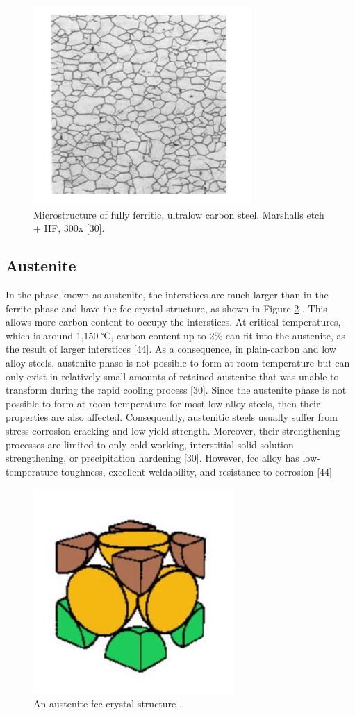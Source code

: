 \documentclass[12pt]{report}
\begin{document}
\begin{figure}[H]
    \centering
    \includegraphics[width=.5\textwidth]{microstructure_of_carbon_steel.jpg}
    \caption{Microstructure of fully ferritic, ultralow carbon steel. Marshalls etch + HF, 300x [30].}
    \label{ch3:figure:microstructure}
\end{figure}

\subsection{Austenite} 
In the phase known as austenite, the interstices are much larger than in the ferrite phase and have the fcc crystal structure, as shown in Figure \ref{ch3:figure:austenite} \cite{bajaj2020steels}. This allows more carbon content to occupy the interstices. At critical temperatures, which is around 1,150 ℃, carbon content up to 2\% can fit into the austenite, as the result of larger interstices [44]. As a consequence, in plain-carbon and low alloy steels, austenite phase is not possible to form at room temperature but can only exist in relatively small amounts of retained austenite that was unable to transform during the rapid cooling process [30].
Since the austenite phase is not possible to form at room temperature for most low alloy steels, then their properties are also affected. Consequently, austenitic steels usually suffer from stress-corrosion cracking and low yield strength. Moreover, their strengthening processes are limited to only cold working, interstitial solid-solution strengthening, or precipitation hardening [30]. However, fcc alloy has low-temperature toughness, excellent weldability, and resistance to corrosion [44]
 
\begin{figure}[H]
    \centering
    \includegraphics[width=.45\textwidth]{austenite_fcc_crystal_structure.jpg}
    \caption{An austenite fcc crystal structure \cite{bajaj2020steels}.}
    \label{ch3:figure:austenite}
\end{figure}
\end{document}
